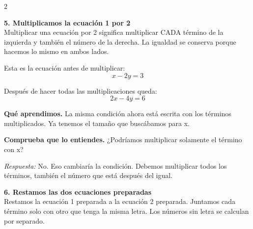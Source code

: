 \documentclass[11pt,a4paper,landscape]{article}
\begin{document}
\begin{multicols*}{2}
\begin{minipage}{\linewidth}
\end{minipage}\par\medskip
\noindent\begin{minipage}{\linewidth}\textbf{5. Multiplicamos la ecuación 1 por 2}\\[2pt]Multiplicar una ecuación por 2 significa multiplicar CADA término de la izquierda y también el número de la derecha. La igualdad se conserva porque hacemos lo mismo en ambos lados.
\par\smallskip Esta es la ecuación antes de multiplicar:
\[x - 2y = 3\]
\par{}\par\smallskip
\par\smallskip Después de hacer todas las multiplicaciones queda:
\[2x - 4y = 6\]
\par\smallskip\textbf{Qué aprendimos.} La misma condición ahora está escrita con los términos multiplicados. Ya tenemos el tamaño que buscábamos para x.
\par\smallskip\textbf{Comprueba que lo entiendes.} ¿Podríamos multiplicar solamente el término con x?\par\textit{Respuesta:} No. Eso cambiaría la condición. Debemos multiplicar todos los términos, también el número que está después del igual.
\end{minipage}\par\medskip
\noindent\begin{minipage}{\linewidth}\textbf{6. Restamos las dos ecuaciones preparadas}\\[2pt]Restamos la ecuación 1 preparada a la ecuación 2 preparada. Juntamos cada término solo con otro que tenga la misma letra. Los números sin letra se calculan por separado.

\end{minipage}
\end{multicols*}
\end{document}

